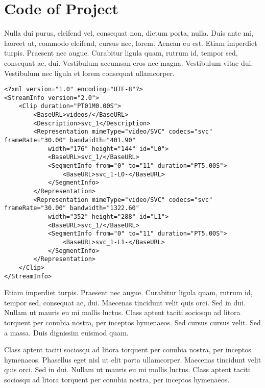 \chapter{Code of Project}
\label{chapter:appendixA}

Nulla dui purus, eleifend vel, consequat non, dictum porta, nulla. Duis ante mi, laoreet ut, commodo eleifend, cursus nec, lorem. Aenean eu est. Etiam imperdiet turpis. Praesent nec augue. Curabitur ligula quam, rutrum id, tempor sed, consequat ac, dui. Vestibulum accumsan eros nec magna. Vestibulum vitae dui. Vestibulum nec ligula et lorem consequat ullamcorper. 

\begin{lstlisting}[frame=lines,style=XML,caption={Example of a XML file.},label=xmlEx]
<?xml version="1.0" encoding="UTF-8"?>
<StreamInfo version="2.0">
    <Clip duration="PT01M0.00S">
        <BaseURL>videos/</BaseURL>
        <Description>svc_1</Description>
        <Representation mimeType="video/SVC" codecs="svc" frameRate="30.00" bandwidth="401.90"
            width="176" height="144" id="L0">
            <BaseURL>svc_1/</BaseURL>
            <SegmentInfo from="0" to="11" duration="PT5.00S">
                <BaseURL>svc_1-L0-</BaseURL>
            </SegmentInfo>
        </Representation>
        <Representation mimeType="video/SVC" codecs="svc" frameRate="30.00" bandwidth="1322.60"
            width="352" height="288" id="L1">
            <BaseURL>svc_1/</BaseURL>
            <SegmentInfo from="0" to="11" duration="PT5.00S">
                <BaseURL>svc_1-L1-</BaseURL>
            </SegmentInfo>
        </Representation>
    </Clip>
</StreamInfo>
\end{lstlisting}

Etiam imperdiet turpis. Praesent nec augue. Curabitur ligula quam, rutrum id, tempor sed, consequat ac, dui. Maecenas tincidunt velit quis orci. Sed in dui. Nullam ut mauris eu mi mollis luctus. Class aptent taciti sociosqu ad litora torquent per conubia nostra, per inceptos hymenaeos. Sed cursus cursus velit. Sed a massa. Duis dignissim euismod quam.


Class aptent taciti sociosqu ad litora torquent per conubia nostra, per inceptos hymenaeos. Phasellus eget nisl ut elit porta ullamcorper. Maecenas tincidunt velit quis orci. Sed in dui. Nullam ut mauris eu mi mollis luctus. Class aptent taciti sociosqu ad litora torquent per conubia nostra, per inceptos hymenaeos.

